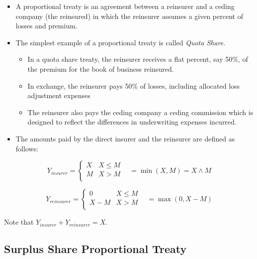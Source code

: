 \documentclass[]{book}
\begin{document}
\begin{itemize}
\item
  A proportional treaty is an agreement between a reinsurer and a ceding
  company (the reinsured) in which the reinsurer assumes a given percent
  of losses and premium.
\item
  The simplest example of a proportional treaty is called \emph{Quota
  Share}.

  \begin{itemize}
  \item
    In a quota share treaty, the reinsurer receives a flat percent, say
    50\%, of the premium for the book of business reinsured.
  \item
    In exchange, the reinsurer pays 50\% of losses, including allocated
    loss adjustment expenses
  \item
    The reinsurer also pays the ceding company a ceding commission which
    is designed to reflect the differences in underwriting expenses
    incurred.
  \end{itemize}
\item
  The amounts paid by the direct insurer and the reinsurer are defined
  as follows:
\end{itemize}

\begin{equation*}
Y_{insurer} =
\begin{cases}
X & X \le M\\
M & X >M \\
\end{cases} \ \ \ \ = \min(X,M) = X \wedge M
\end{equation*}

\begin{equation*}
Y_{reinsurer} =
\begin{cases}
0 & X \le M\\
X- M & X >M \\
\end{cases} \ \ \ \  = \max(0,X-M)
\end{equation*}

Note that \(Y_{insurer}+Y_{reinsurer}=X\).

\subsection{Surplus Share Proportional
Treaty}\label{surplus-share-proportional-treaty}
\end{document}
